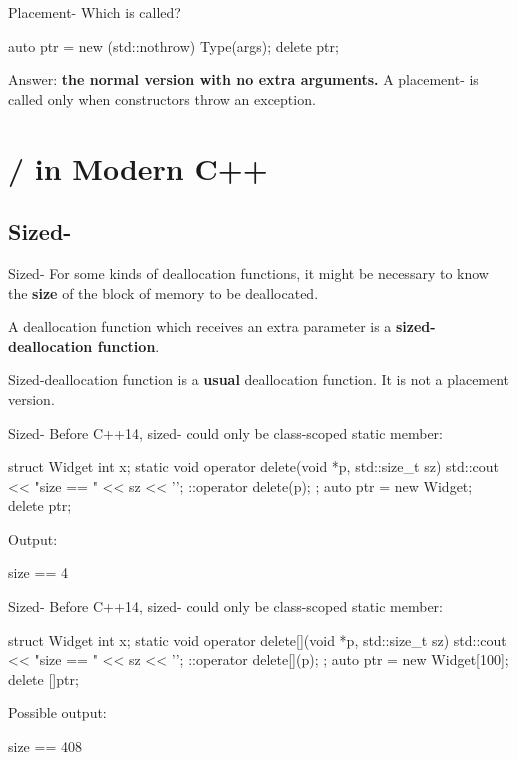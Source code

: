 \documentclass{beamer}
\begin{document}
\begin{frame}[fragile]{Placement-}
  Which  is called?
  \begin{cpp}
auto ptr = new (std::nothrow) Type(args);
delete ptr;
  \end{cpp}
  \pause
  Answer: \textbf{the normal version with no extra arguments.} A placement- is called only when constructors throw an exception.
\end{frame}

\section{/ in Modern C++}

\subsection{Sized-}

\begin{frame}{Sized-}
  For some kinds of deallocation functions, it might be necessary to know the \textbf{size} of the block of memory to be deallocated.\par
  A deallocation function which receives an extra  parameter is a \textbf{sized-deallocation function}.
  \begin{notice}
    Sized-deallocation function is a \textbf{usual} deallocation function. It is not a placement version.
  \end{notice}
\end{frame}

\begin{frame}[fragile]{Sized-}
  Before C++14, sized- could only be class-scoped static member:
  \begin{cpp}
struct Widget {
  int x;
  static void operator delete(void *p, std::size_t sz) {
    std::cout << "size == " << sz << '\n';
    ::operator delete(p);
  }
};
auto ptr = new Widget;
delete ptr;
  \end{cpp}
  Output:
  \begin{txt}
size == 4
  \end{txt}
\end{frame}

\begin{frame}[fragile]{Sized-}
  Before C++14, sized- could only be class-scoped static member:
  \begin{cpp}
struct Widget {
  int x;
  static void operator delete[](void *p, std::size_t sz) {
    std::cout << "size == " << sz << '\n';
    ::operator delete[](p);
  }
};
auto ptr = new Widget[100];
delete []ptr;
  \end{cpp}
  Possible output:
  \begin{txt}
size == 408
  \end{txt}
\end{frame}
\end{document}

